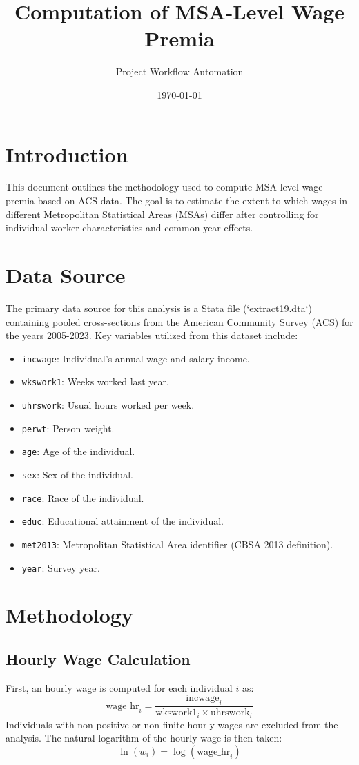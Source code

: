 \documentclass{article}
\title{Computation of MSA-Level Wage Premia}
\author{Project Workflow Automation}
\date{\today}
\begin{document}
\maketitle

\section{Introduction}
This document outlines the methodology used to compute MSA-level wage premia based on ACS data. The goal is to estimate the extent to which wages in different Metropolitan Statistical Areas (MSAs) differ after controlling for individual worker characteristics and common year effects.

\section{Data Source}
The primary data source for this analysis is a Stata file (`extract19.dta`) containing pooled cross-sections from the American Community Survey (ACS) for the years 2005-2023. Key variables utilized from this dataset include:
\begin{itemize}
    \item \texttt{incwage}: Individual's annual wage and salary income.
    \item \texttt{wkswork1}: Weeks worked last year.
    \item \texttt{uhrswork}: Usual hours worked per week.
    \item \texttt{perwt}: Person weight.
    \item \texttt{age}: Age of the individual.
    \item \texttt{sex}: Sex of the individual.
    \item \texttt{race}: Race of the individual.
    \item \texttt{educ}: Educational attainment of the individual.
    \item \texttt{met2013}: Metropolitan Statistical Area identifier (CBSA 2013 definition).
    \item \texttt{year}: Survey year.
\end{itemize}

\section{Methodology}

\subsection{Hourly Wage Calculation}
First, an hourly wage is computed for each individual $i$ as:
\begin{equation}
    \text{wage\_hr}_i = \frac{\text{incwage}_i}{\text{wkswork1}_i \times \text{uhrswork}_i}
\end{equation}
Individuals with non-positive or non-finite hourly wages are excluded from the analysis. The natural logarithm of the hourly wage is then taken:
\begin{equation}
    \ln(w_i) = \log(\text{wage\_hr}_i)
\end{equation}
\end{document}
